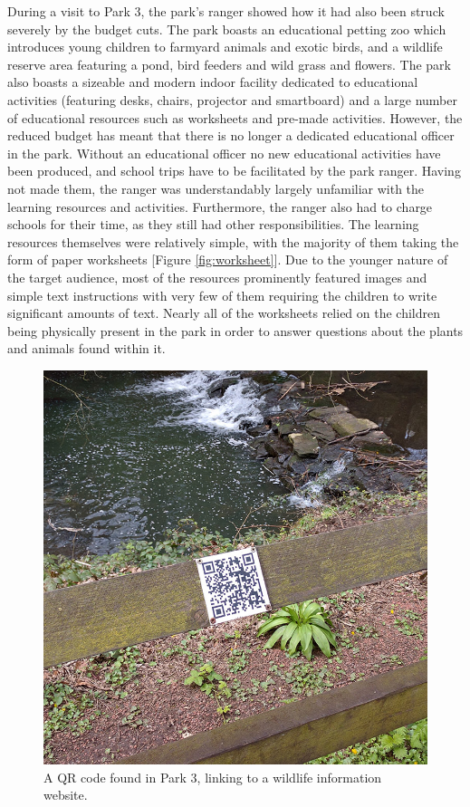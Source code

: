 During a visit to Park 3, the park's ranger showed how it had also been struck severely by the budget cuts. The park boasts an educational petting zoo which introduces young children to farmyard animals and exotic birds, and a wildlife reserve area featuring a pond, bird feeders and wild grass and flowers. The park also boasts a sizeable and modern indoor facility dedicated to educational activities (featuring desks, chairs, projector and smartboard) and a large number of educational resources such as worksheets and pre-made activities. However, the reduced budget has meant that there is no longer a dedicated educational officer in the park. Without an educational officer no new educational activities have been produced, and school trips have to be facilitated by the park ranger. Having not made them, the ranger was understandably largely unfamiliar with the learning resources and activities. Furthermore, the ranger also had to charge schools for their time, as they still had other responsibilities. The learning resources themselves were relatively simple, with the majority of them taking the form of paper worksheets [Figure \ref{fig:worksheet}]. Due to the younger nature of the target audience, most of the resources prominently featured images and simple text instructions with very few of them requiring the children to write significant amounts of text. Nearly all of the worksheets relied on the children being physically present in the park in order to answer questions about the plants and animals found within it.

\begin{figure}
  \centering
  \includegraphics[width=0.5\columnwidth]{images/chapter04/jesmondQR.jpg}
  \caption[An existing QR code in Park 3]{A QR code found in Park 3, linking to a wildlife information website.}
  \label{fig:jesmondQR}
\end{figure}

